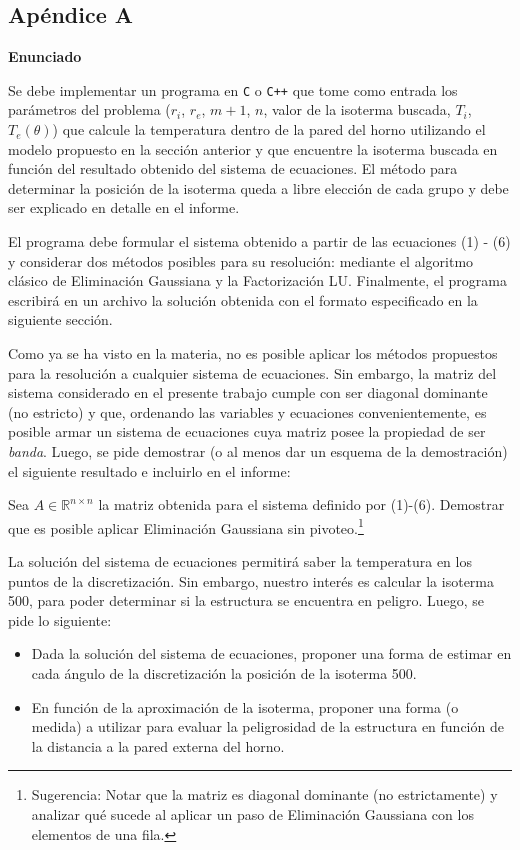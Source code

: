 \subsection{Apéndice A}

{\bf Enunciado}

Se debe implementar un programa en \verb+C+ o \verb-C++- que tome como entrada los par\'ametros del problema ($r_i$, $r_e$, $m+1$,
$n$, valor de la isoterma buscada, $T_i$, $T_e(\theta)$) que calcule la temperatura dentro de la pared del horno utilizando el
modelo propuesto en la secci\'on anterior y que encuentre la isoterma buscada en funci\'on del resultado obtenido del
sistema de ecuaciones. El m\'etodo para determinar la posici\'on de la isoterma queda a libre elecci\'on de cada grupo y
debe ser explicado en detalle en el informe.

El programa debe formular el sistema obtenido a partir de las ecuaciones (1) - (6) y considerar dos m\'etodos posibles
para su resoluci\'on: mediante el algoritmo cl\'asico de Eliminaci\'on Gaussiana y la Factorizaci\'on LU. Finalmente, el
programa escribir\'a en un archivo la soluci\'on obtenida con el formato especificado en la siguiente secci\'on.

Como ya se ha visto en la materia, no es posible aplicar los m\'etodos propuestos para la resoluci\'on a cualquier
sistema de ecuaciones. Sin embargo, la matriz del sistema considerado en el presente trabajo cumple con ser diagonal dominante (no
estricto) y que, ordenando las variables y ecuaciones convenientemente, es posible armar un sistema de ecuaciones cuya matriz
posee la propiedad de ser \emph{banda}. Luego, se pide demostrar (o al menos dar un esquema de la demostraci\'on)
el siguiente resultado e incluirlo en el informe:

\begin{proposition}
Sea $A \in \mathbb{R}^{n \times n}$ la matriz obtenida para el sistema definido por (1)-(6). Demostrar que es posible
aplicar Eliminaci\'on Gaussiana sin pivoteo.\footnote{Sugerencia: Notar que la matriz es diagonal dominante (no
estrictamente) y analizar qué sucede al aplicar un paso de Eliminaci\'on Gaussiana con los elementos de una fila.} 
\end{proposition}

La soluci\'on del sistema de ecuaciones permitir\'a saber la temperatura en los puntos de la discretizaci\'on. Sin embargo,
nuestro inter\'es es calcular la isoterma 500, para poder determinar si la estructura se encuentra en peligro. Luego, se pide lo siguiente:
\begin{itemize}
\item Dada la soluci\'on del sistema de ecuaciones, proponer una forma de estimar en cada \'angulo de la discretizaci\'on la posici\'on de la 
isoterma 500.
\item En funci\'on de la aproximaci\'on de la isoterma, proponer una forma (o medida) a utilizar para evaluar la peligrosidad de la estructura
en funci\'on de la distancia a la pared externa del horno.
\end{itemize}


